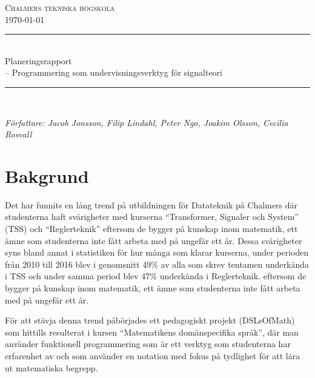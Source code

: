 \documentclass{article}
\begin{document}
\begin{titlepage} \newcommand{\HRule}{\rule{\linewidth}{0.3mm}}
\center
\textsc{\Large Chalmers tekniska högskola}\\[0.05cm] %
\normalsize \today

\HRule \\[0.08cm]
{ \large Planeringsrapport \\ \normalsize{-- Programmering som undervisningsverktyg för signalteori}}\\[0.08cm]
\HRule \\[0.3cm]

\begin{minipage}{0.5\textwidth}
\begin{flushleft} \small
\emph{Författare: Jacob Jonsson, Filip Lindahl, Peter Ngo, Joakim Olsson, Cecilia Rosvall}
\end{flushleft}

\end{minipage}


\end{titlepage}
\newpage
\tableofcontents
\newpage




\section{Bakgrund}
Det har funnits en lång trend på utbildningen för Datateknik på Chalmers där studenterna haft svårigheter med kurserna “Transformer, Signaler och System” (TSS) och “Reglerteknik”
eftersom de bygger på kunskap inom matematik, ett ämne som studenterna inte fått arbeta med på ungefär ett år. Dessa svårigheter syns bland annat i statistiken för hur många som klarar kurserna, under perioden från 2010 till 2016 blev i genomsnitt 49\% av alla som skrev tentamen underkända i TSS och under samma period blev 47\% underkända i Reglerteknik.
eftersom de bygger på kunskap inom matematik, ett ämne som studenterna inte fått arbeta med på ungefär ett år.

För att stävja denna trend påbörjades ett pedagogiskt projekt (DSLsOfMath) som hittills resulterat i kursen “Matematikens domänspecifika språk”, där man använder funktionell programmering som är ett verktyg som studenterna har erfarenhet av och som använder en notation med fokus på tydlighet för att lära ut matematiska begrepp.
\end{document}
